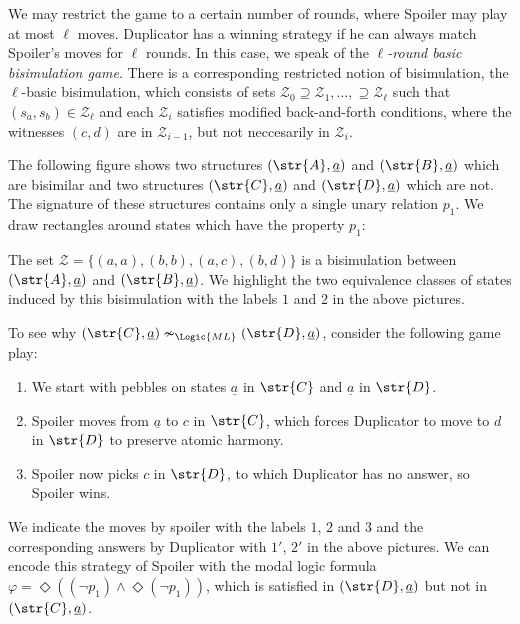 We may restrict the game to a certain number of rounds, where Spoiler may play at most $\ell$ moves.
Duplicator has a winning strategy if he can always match Spoiler's moves for $\ell$ rounds.
In this case, we speak of the \emph{$\ell$-round basic bisimulation game}.
There is a corresponding restricted notion of bisimulation, the $\ell$-basic bisimulation, which consists of sets $\mathcal{Z}_{0} \supseteq \mathcal{Z}_{1}, \ldots, \supseteq \mathcal{Z}_{\ell}$ such that $(s_{a}, s_{b}) \in \mathcal{Z}_{\ell}$ and each $\mathcal{Z}_{i}$ satisfies modified back-and-forth conditions, where the witnesses $(c,d)$ are in $\mathcal{Z}_{i-1}$, but not neccesarily in $\mathcal{Z}_{i}$.

\begin{example}
  The following figure shows two structures $(\str{A}, \underline{a})$ and $(\str{B}, \underline{a})$ which are bisimilar and two structures $(\str{C}, \underline{a})$ and $(\str{D}, \underline{a})$ which are not.
  The signature of these structures contains only a single unary relation $p_{1}$.
  We draw rectangles around states which have the property $p_{1}$:

  \vspace{1em}
  

  \noindent
  The set $\mathcal{Z} = \{(a,a), (b,b), (a,c), (b,d) \}$ is a bisimulation between $(\str{A}, \underline{a})$ and $(\str{B}, \underline{a})$.
  We highlight the two equivalence classes of states induced by this bisimulation with the labels $1$ and $2$ in the above pictures.

  \noindent
  To see why $(\str{C}, \underline{a}) \nsim_{\Logic{ML}} (\str{D}, \underline{a})$, consider the following game play:
  \begin{enumerate}
    \item We start with pebbles on states $\underline{a}$ in $\str{C}$ and $\underline{a}$ in $\str{D}$.
    \item Spoiler moves from $\underline{a}$ to $c$ in $\str{C}$, which forces Duplicator to move to $d$ in $\str{D}$ to preserve atomic harmony.
    \item Spoiler now picks $c$ in $\str{D}$, to which Duplicator has no answer, so Spoiler wins.
  \end{enumerate}
  We indicate the moves by spoiler with the labels $1$, $2$ and $3$ and the corresponding answers by Duplicator with $1'$, $2'$ in the above pictures.
  We can encode this strategy of Spoiler with the modal logic formula $\varphi = \Diamond((\neg p_{1}) \land \Diamond (\neg p_{1}))$, which is satisfied in $(\str{D}, \underline{a})$ but not in $(\str{C}, \underline{a})$.
\end{example}

